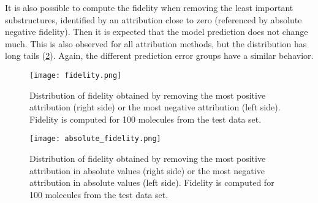 It is also possible to compute the fidelity when removing the least important 
substructures, identified by an attribution close to zero (referenced by absolute 
negative fidelity). Then it is expected that the model prediction does not change 
much. This is also observed for all attribution methods, but the distribution has 
long tails (\cref{fig:absolute_fidelity}). Again, the different prediction error 
groups have a similar behavior.


\begin{figure}[h]
    \centering
    \texttt{[image: fidelity.png]}
    \caption{Distribution of fidelity obtained by removing the most positive 
        attribution (right side) or the most negative attribution (left side).
        Fidelity is computed for 100 molecules from the test data set.
    }
    \label{fig:fidelity}
\end{figure}


\begin{figure}[h]
    \centering
    \texttt{[image: absolute\_fidelity.png]}
    \caption{Distribution of fidelity obtained by removing the most positive 
        attribution in absolute values (right side) or the most negative 
        attribution in absolute values (left side).
        Fidelity is computed for 100 molecules from the test data set.
    }
    \label{fig:absolute_fidelity}
\end{figure}
